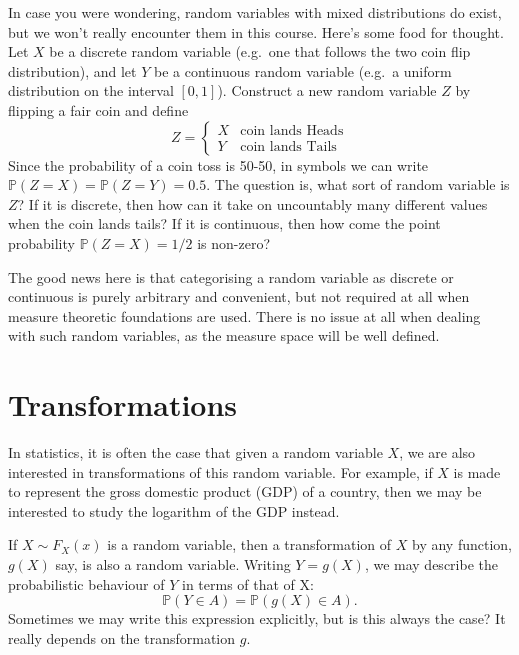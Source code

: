 \documentclass[
]{book}
\newcommand{\bbP}{\mathbb{P}}
\theoremstyle{definition}
\theoremstyle{definition}
\theoremstyle{definition}
\theoremstyle{definition}
\theoremstyle{remark}
\begin{document}
In case you were wondering, random variables with mixed distributions do exist, but we won't really encounter them in this course.
Here's some food for thought.
Let \(X\) be a discrete random variable (e.g.~one that follows the two coin flip distribution), and let \(Y\) be a continuous random variable (e.g.~a uniform distribution on the interval \([0,1]\)).
Construct a new random variable \(Z\) by flipping a fair coin and define
\[
Z = \begin{cases}
X & \text{coin lands Heads} \\
Y & \text{coin lands Tails}
\end{cases}
\]
Since the probability of a coin toss is 50-50, in symbols we can write \(\bbP(Z=X)=\bbP(Z=Y)=0.5\).
The question is, what sort of random variable is \(Z\)?
If it is discrete, then how can it take on uncountably many different values when the coin lands tails?
If it is continuous, then how come the point probability \(\bbP(Z=X)=1/2\) is non-zero?

The good news here is that categorising a random variable as discrete or continuous is purely arbitrary and convenient, but not required at all when measure theoretic foundations are used.
There is no issue at all when dealing with such random variables, as the measure space will be well defined.

\hypertarget{transformations}{%
\section{Transformations}\label{transformations}}

In statistics, it is often the case that given a random variable \(X\), we are also interested in transformations of this random variable.
For example, if \(X\) is made to represent the gross domestic product (GDP) of a country, then we may be interested to study the logarithm of the GDP instead.

If \(X\sim F_X(x)\) is a random variable, then a transformation of \(X\) by any function, \(g(X)\) say, is also a random variable.
Writing \(Y=g(X)\), we may describe the probabilistic behaviour of \(Y\) in terms of that of X:
\begin{equation}
\bbP(Y\in A) = \bbP(g(X)\in A). \label{eq:probtransform1}
\end{equation}
Sometimes we may write this expression explicitly, but is this always the case?
It really depends on the transformation \(g\).
\end{document}
